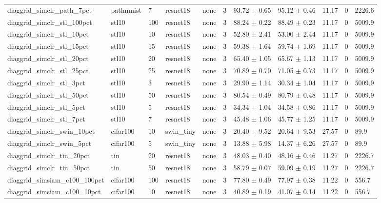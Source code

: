 \begin{tabular}{lllllllllll}
diaggrid_simclr_path_7pct & pathmnist & 7 & resnet18 & none & 3 & 93.72 $\pm$ 0.65 & 95.12 $\pm$ 0.46 & 11.17 & 0 & 2226.6 \\
diaggrid_simclr_stl_100pct & stl10 & 100 & resnet18 & none & 3 & 88.24 $\pm$ 0.22 & 88.49 $\pm$ 0.23 & 11.17 & 0 & 5009.9 \\
diaggrid_simclr_stl_10pct & stl10 & 10 & resnet18 & none & 3 & 52.80 $\pm$ 2.41 & 53.00 $\pm$ 2.44 & 11.17 & 0 & 5009.9 \\
diaggrid_simclr_stl_15pct & stl10 & 15 & resnet18 & none & 3 & 59.38 $\pm$ 1.64 & 59.74 $\pm$ 1.69 & 11.17 & 0 & 5009.9 \\
diaggrid_simclr_stl_20pct & stl10 & 20 & resnet18 & none & 3 & 65.40 $\pm$ 1.05 & 65.67 $\pm$ 1.13 & 11.17 & 0 & 5009.9 \\
diaggrid_simclr_stl_25pct & stl10 & 25 & resnet18 & none & 3 & 70.89 $\pm$ 0.70 & 71.05 $\pm$ 0.73 & 11.17 & 0 & 5009.9 \\
diaggrid_simclr_stl_3pct & stl10 & 3 & resnet18 & none & 3 & 29.90 $\pm$ 1.14 & 30.34 $\pm$ 1.04 & 11.17 & 0 & 5009.9 \\
diaggrid_simclr_stl_50pct & stl10 & 50 & resnet18 & none & 3 & 80.54 $\pm$ 0.49 & 80.79 $\pm$ 0.48 & 11.17 & 0 & 5009.9 \\
diaggrid_simclr_stl_5pct & stl10 & 5 & resnet18 & none & 3 & 34.34 $\pm$ 1.04 & 34.58 $\pm$ 0.86 & 11.17 & 0 & 5009.9 \\
diaggrid_simclr_stl_7pct & stl10 & 7 & resnet18 & none & 3 & 45.48 $\pm$ 1.06 & 45.77 $\pm$ 1.25 & 11.17 & 0 & 5009.9 \\
diaggrid_simclr_swin_10pct & cifar100 & 10 & swin_tiny & none & 3 & 20.40 $\pm$ 9.52 & 20.64 $\pm$ 9.53 & 27.57 & 0 & 89.9 \\
diaggrid_simclr_swin_5pct & cifar100 & 5 & swin_tiny & none & 3 & 13.88 $\pm$ 5.98 & 14.37 $\pm$ 6.26 & 27.57 & 0 & 89.9 \\
diaggrid_simclr_tin_20pct & tin & 20 & resnet18 & none & 3 & 48.03 $\pm$ 0.40 & 48.16 $\pm$ 0.46 & 11.27 & 0 & 2226.7 \\
diaggrid_simclr_tin_50pct & tin & 50 & resnet18 & none & 3 & 58.79 $\pm$ 0.07 & 59.09 $\pm$ 0.19 & 11.27 & 0 & 2226.7 \\
diaggrid_simsiam_c100_100pct & cifar100 & 100 & resnet18 & none & 3 & 77.80 $\pm$ 0.49 & 77.97 $\pm$ 0.38 & 11.22 & 0 & 556.7 \\
diaggrid_simsiam_c100_10pct & cifar100 & 10 & resnet18 & none & 3 & 40.89 $\pm$ 0.19 & 41.07 $\pm$ 0.14 & 11.22 & 0 & 556.7 \\

\end{tabular}
